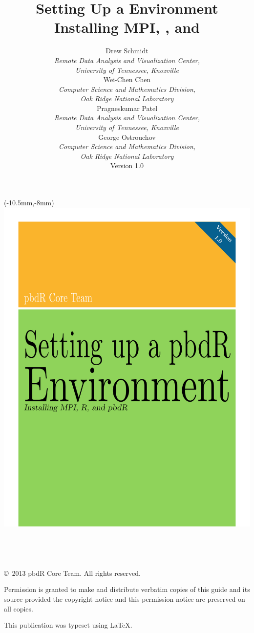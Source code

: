 \documentclass[a4paper,11pt]{article}
\title{}
\title{\Huge Setting Up a \proglang{pbdR} Environment\\[.3cm] 
  {\LARGE Installing MPI, \proglang{R}, and \proglang{pbdR}}}
\author{
\begin{minipage}{\textwidth}
\centering
%
%
Drew Schmidt\\
{\small\emph{Remote Data Analysis and Visualization Center,\\
University of Tennessee, Knoxville}}\\[.4cm]
Wei-Chen Chen\\
{\small\emph{Computer Science and Mathematics Division, \\
Oak Ridge National Laboratory}}\\[.4cm]
Pragneskumar Patel\\
{\small\emph{Remote Data Analysis and Visualization Center,\\
University of Tennessee, Knoxville}}\\[.4cm]
%
George Ostrouchov\\
{\small\emph{Computer Science and Mathematics Division, \\
Oak Ridge National Laboratory}}
\\[2.5in]
Version 1.0
%
\end{minipage}
}
\begin{document}
\prebodyheadfoot

\begin{textblock*}{0mm}(-10.5mm,-8mm)
\includegraphics[scale=1.07]{./_all/cover/cover_2}
\end{textblock*}

\newpage\ \newpage

\date{}
\maketitle

\ \vfill

\copyright\ 2013 pbdR Core Team.  All rights reserved.

Permission is granted to make and distribute verbatim copies of this guide and its source provided the copyright notice and this permission notice are preserved on all copies.

This publication was typeset using \LaTeX.  


\newpage
{}
\fancyhf[R]{\thepage }
\fancyfoot{}
\tableofcontents


\newpage
{}
\setcounter{page}{1}
\pagestyle{fancy}

\bodyheadfoot





% 
% 

\end{document}
